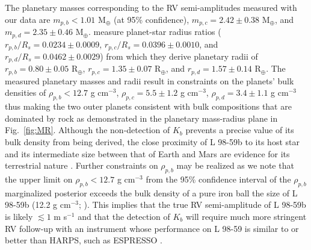 \documentclass[longauth]{aa}
\newcommand{\mps}{m s$^{-1}$}
\newcommand{\gcm}{g cm$^{-3}$}
\begin{document}
The planetary masses corresponding to the RV semi-amplitudes measured with our data are $m_{p,b} < 1.01$ M$_{\oplus}$ (at 95\% confidence), $m_{p,c}=2.42\pm 0.38$ M$_{\oplus}$, and $m_{p,d}=2.35\pm 0.46$ M$_{\oplus}$.  measure planet-star radius ratios ($r_{p,b}/R_s=0.0234\pm 0.0009$, $r_{p,c}/R_s=0.0396\pm 0.0010$, and $r_{p,d}/R_s=0.0462\pm 0.0029$) from which they derive planetary radii of $r_{p,b}=0.80\pm 0.05$ R$_{\oplus}$, $r_{p,c}=1.35\pm 0.07$ R$_{\oplus}$, and $r_{p,d}=1.57\pm 0.14$ R$_{\oplus}$. The measured planetary masses and radii result in constraints on the planets' bulk densities of $\rho_{p,b}<12.7$ \gcm{,} $\rho_{p,c}=5.5\pm 1.2$ \gcm{,} $\rho_{p,d}=3.4\pm 1.1$ \gcm{} thus making the two outer planets consistent with bulk compositions that are dominated by rock as demonstrated in the planetary mass-radius plane in Fig.~\ref{fig:MR}. Although the non-detection of $K_b$ prevents a precise value of its bulk density from being derived, the close proximity of L 98-59b to its host star and its intermediate size between that of Earth and Mars are evidence for its terrestrial nature \citep{owen13,jin14,lopez14,chen16,lopez16,owen17}. Further constraints on $\rho_{p,b}$ may be realized as we note that the upper limit on $\rho_{p,b}<12.7$ \gcm{} from the 95\% confidence interval of the $\rho_{p,b}$ marginalized posterior exceeds the bulk density of a pure iron ball the size of L 98-59b (12.2 \gcm{;} \citealt{zeng13}). This implies that the true RV semi-amplitude of L 98-59b is likely $\lesssim 1$ \mps{} and that the detection of $K_b$ will require much more stringent RV follow-up with an instrument whose performance on L 98-59 is similar to or better than HARPS, such as ESPRESSO \citep{pepe10}.
\end{document}

